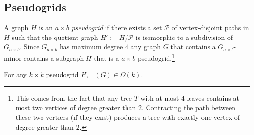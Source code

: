 \documentclass{patmorin}
\DeclareMathOperator{\chilin}{\chi_{\mathrm{lin}}}
\begin{document}
\subsection{Pseudogrids}

A graph $H$ is an $a\times b$ \emph{pseudogrid} if there exists a set $\mathcal{P}$ of vertex-disjoint paths in $H$ such that the quotient graph $H':=H/\mathcal{P}$ is isomorphic to a subdivision of $G_{a\times b}$.  Since $G_{a\times b}$ has maximum degree $4$ any graph $G$ that contains a $G_{a\times b}$-minor contains a subgraph $H$ that is a $a\times b$ pseudogrid.\footnote{This comes from the fact that any tree $T$ with at most $4$ leaves contains at most two vertices of degree greater than $2$.  Contracting the path between these two vertices (if they exist) produces a tree with exactly one vertex of degree greater than $2$.}

\begin{lem}
  For any $k\times k$ pseudogrid $H$, $\chilin(G)\in\Omega(k)$.
\end{lem}
\end{document}
